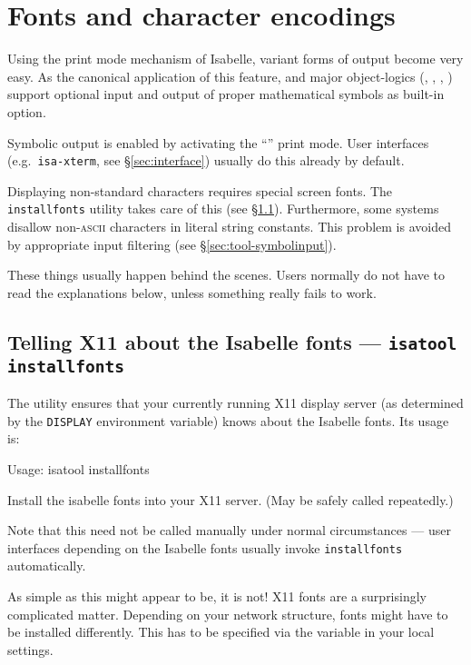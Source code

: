 

\chapter{Fonts and character encodings}

Using the print mode mechanism of Isabelle, variant forms of output become
very easy. As the canonical application of this feature, {\Pure} and major
object-logics (\FOL, \ZF, \HOL, \HOLCF) support optional input and output of
proper mathematical symbols as built-in option.

Symbolic output is enabled by activating the ``'' print mode.
User interfaces (e.g.\ \texttt{isa-xterm}, see \S\ref{sec:interface}) usually
do this already by default.

\medskip Displaying non-standard characters requires special screen fonts. The
\texttt{installfonts} utility takes care of this (see
\S\ref{sec:tool-installfonts}). Furthermore, some {\ML} systems disallow
non-\textsc{ascii} characters in literal string constants.  This problem is
avoided by appropriate input filtering (see \S\ref{sec:tool-symbolinput}).

These things usually happen behind the scenes.  Users normally do not have to
read the explanations below, unless something really fails to work.


\section{Telling X11 about the Isabelle fonts --- \texttt{isatool installfonts}}
\label{sec:tool-installfonts}

The  utility ensures that your currently running X11
display server (as determined by the \texttt{DISPLAY} environment variable)
knows about the Isabelle fonts. Its usage is:
\begin{ttbox}
Usage: isatool installfonts

  Install the isabelle fonts into your X11 server.
  (May be safely called repeatedly.)
\end{ttbox}
Note that this need not be called manually under normal circumstances --- user
interfaces depending on the Isabelle fonts usually invoke
\texttt{installfonts} automatically.

\medskip As simple as this might appear to be, it is not! X11 fonts are a
surprisingly complicated matter. Depending on your network structure, fonts
might have to be installed differently. This has to be specified via the
 variable in your local settings.

